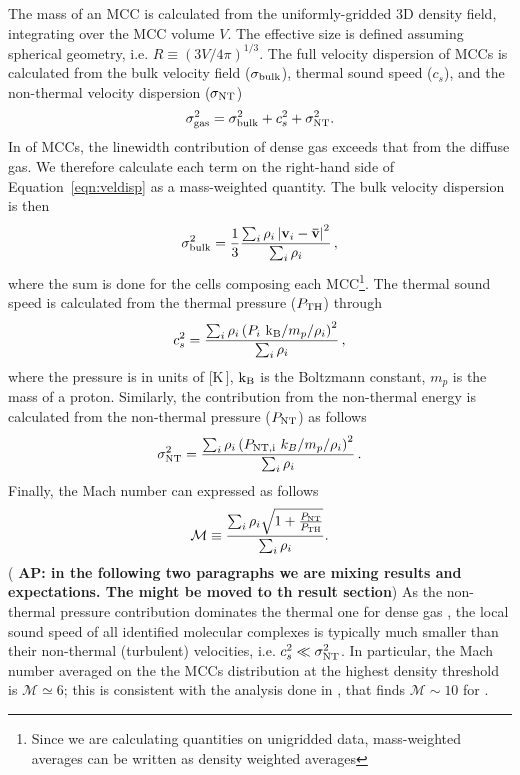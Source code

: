 \IfFileExists{emulateapjlegacy.cls}{\documentclass[iop]{emulateapjlegacy}}{\documentclass[iop]{emulateapj}}
\newcommand{\AP}[1]{({\bf \color{apcolor} AP: #1})}
\begin{document}
The mass of an MCC is calculated from the uniformly-gridded 3D density field, integrating over the MCC volume $V$. The effective size is defined assuming spherical geometry, i.e. $R \equiv (3 V /4 \pi)^{1/3}$.
%
The full velocity dispersion of MCCs is calculated from the bulk velocity field ($\sigma_{\rm bulk}$), thermal sound speed ($c_s$), and the non-thermal velocity dispersion ($\sigma_{\rm NT}$)
\begin{equation}
\sigma_{\rm gas}^2 = \sigma_{\rm bulk}^2 + c_s^2 + \sigma_{\rm NT}^2.
\label{eqn:veldisp}
\end{equation}
%
In \obs of MCCs, the linewidth contribution of dense gas exceeds that from the diffuse gas. We therefore calculate each term on the right-hand side of Equation~\ref{eqn:veldisp} as a mass-weighted quantity.
%
The bulk velocity dispersion is then
\begin{equation}
\sigma_{\rm bulk}^2 = \frac{1}{{3}}\frac{\sum_{i} \rho_i \left|\mathbf{v}_i - \mathbf{\bar v}\right|^2}{\sum_i \rho_i}\,,
\end{equation}
where the sum is done for the cells composing each MCC\footnote{Since we are calculating quantities on unigridded data, mass-weighted averages can be written as density weighted averages}.
%
The thermal sound speed is calculated from the thermal pressure ($P_{\rm TH}$) through
\begin{equation}
c_s^2 = \frac{\sum_{i} \rho_i \left(P_i~{\rm k_B} / m_p / \rho_i \right)^2}{\sum_i \rho_i}\,,
\end{equation}
where the pressure is in units of [K\,\cc], $\rm k_B$ is the Boltzmann constant, $m_p$ is the mass of a proton. Similarly, the contribution from the non-thermal energy is calculated from the non-thermal pressure ($P_{\rm NT}$) as follows
\begin{equation}
\sigma_{\rm NT}^2 = \frac{\sum_{i} \rho_i \left(P_{\rm NT, i}~k_B / m_p / \rho_i \right)^2}{\sum_i \rho_i}\,.
\end{equation}
%
Finally, the Mach number can expressed as follows
\begin{equation}
\mathcal{M} \equiv \frac{\sum_{i} \rho_i \sqrt{ 1 + \frac{P_{\rm NT}}{P_{\rm TH}}}}{\sum_{i} \rho_i}.
\label{eqn:MPress}
\end{equation}
\AP{in the following two paragraphs we are mixing results and expectations. The might be moved to th result section}
As the non-thermal pressure contribution dominates the thermal one for dense gas \citet{Pallottini17b}, the local sound speed of all identified molecular complexes is typically much smaller than their non-thermal (turbulent) velocities, i.e. $c_s^2 \ll \sigma_{\rm NT}^2$. In particular, the Mach number averaged on the the MCCs distribution at the highest density threshold is $\mathcal{M} \simeq6$; this is consistent with the analysis done in \citep{Vallini18a}, that finds $\mathcal{M} \sim 10$ for \flower.
\end{document}
